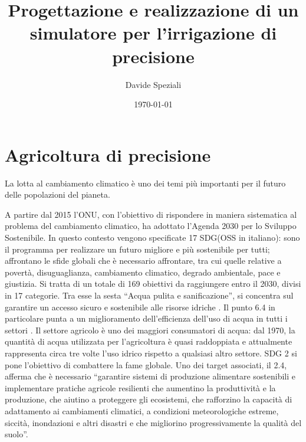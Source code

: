 \documentclass[12pt,a4paper,openright,twoside, openany]{book}
\title{Progettazione e realizzazione di un simulatore per l'irrigazione di precisione}
\author{Davide Speziali}
\date{\today}
\begin{document}
\frontmatter\frontispiece
%

%
\tableofcontents
\listoffigures     %

\mainmatter
%
%
\chapter{Agricoltura di precisione}
%
La lotta al cambiamento climatico è uno dei temi più importanti per il futuro delle popolazioni del pianeta.

A partire dal 2015 l'\ac{ONU}, con l'obiettivo di rispondere in maniera sistematica al problema del cambiamento climatico, ha adottato l'Agenda 2030 per lo Sviluppo Sostenibile.
In questo contesto vengono specificate 17 \ac{SDG}(\ac{OSS} in italiano): sono il programma per realizzare un futuro migliore e più sostenibile per tutti; affrontano le sfide globali che è necessario affrontare, tra cui quelle relative a povertà, disuguaglianza, cambiamento climatico, degrado ambientale, pace e giustizia\cite{SDG-defininition}. Si tratta di un totale di 169 obiettivi da raggiungere entro il 2030, divisi in 17 categorie. Tra esse la sesta ``Acqua pulita e sanificazione'', si concentra sul garantire un accesso sicuro e sostenibile alle risorse idriche \cite{SDG-6}. Il punto 6.4 in particolare punta a un miglioramento dell'efficienza dell'uso di acqua in tutti i settori \cite{SDG-6-4-1,UN-WATER-WATER-USE-EFF-21}.
Il settore agricolo è uno dei maggiori consumatori di acqua: dal 1970, la quantità di acqua utilizzata per l'agricoltura è quasi raddoppiata e attualmente rappresenta circa tre volte l'uso idrico rispetto a qualsiasi altro settore\cite{FAO-AQUASTAT-2020}.
\ac{SDG} 2 si pone l'obiettivo di combattere la fame globale. Uno dei target associati, il 2.4, afferma che è necessario ``garantire sistemi di produzione alimentare sostenibili e implementare pratiche agricole resilienti che aumentino la produttività e la produzione, che aiutino a proteggere gli ecosistemi, che rafforzino la capacità di adattamento ai cambiamenti climatici, a condizioni meteorologiche estreme, siccità, inondazioni e altri disastri e che migliorino progressivamente la qualità del suolo''\cite{SDG-2.4}.
\end{document}
